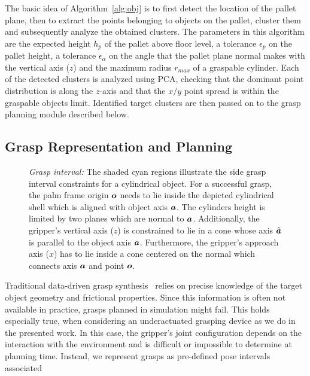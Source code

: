 The basic idea of Algorithm~\ref{alg:obj} is to first detect the location of the pallet plane, then
to extract the points belonging to objects on the pallet, cluster them and subsequently analyze the
obtained clusters. The parameters in this algorithm are the expected height $h_p$ of the pallet
above floor level, a tolerance $\epsilon_p$ on the pallet height, a tolerance $\epsilon_{\alpha}$ on
the angle that the pallet plane normal makes with the vertical axis ($z$) and the maximum radius
$r_{max}$ of a graspable cylinder. Each of the detected clusters is analyzed using PCA, checking
that the dominant point distribution is along the $z$-axis and that the $x/y$ point spread is within
the graspable objects limit. Identified target clusters are then passed on to the grasp planning
module described below.
%
\subsection{Grasp Representation and Planning}
\label{subsec:grasp_planning}
%
\begin{figure}[t!] 
   \centering
    \def\svgwidth{235pt} 
     
    \caption{\textit{Grasp interval:} The shaded cyan regions illustrate the side grasp interval
      constraints for a cylindrical object. For a successful grasp, the palm frame origin $\mbox{\boldmath $o$}$
      needs to lie inside the depicted cylindrical shell which is aligned with object axis
      $\mbox{\boldmath $a$}$. The cylinders height is limited by two planes which are normal to
      $\mbox{\boldmath $a$}$. Additionally, the gripper's vertical axis ($z$) is constrained to lie in a cone
      whose axis $\hat{\mbox{\boldmath $a$}}$ is parallel to the object axis $\mbox{\boldmath $a$}$. Furthermore, the
      gripper's approach axis ($x$) has to lie inside a cone centered on the normal which connects
      axis $\mbox{\boldmath $a$}$ and point $\mbox{\boldmath $o$}$.}
   \label{fig:grasp_interval}
   \vspace{-0.5cm}
\end{figure}
%
Traditional data-driven grasp synthesis~\cite{Bohg14} relies on precise knowledge of the target
object geometry and frictional properties. Since this information is often not available in
practice, grasps planned in simulation might fail. This holds especially true, when considering an
underactuated grasping device as we do in the presented work. In this case, the gripper's joint
configuration depends on the interaction with the environment and is difficult or impossible to
determine at planning time. Instead, we represent grasps as pre-defined pose intervals associated
